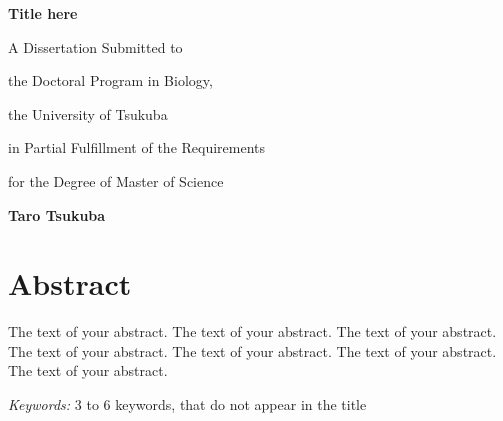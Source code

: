 \documentclass[12pt, a4paper]{report} %
\begin{document}
\def\spacingset#1{\renewcommand{\baselinestretch}%
{#1}\small\normalsize} \spacingset{1}


%


    \thispagestyle{empty}
    \vspace*{30mm}
    \begin{center}
    \LARGE{\bf Title here}
    \end{center}

    \vspace{6cm}
    \centerline{A Dissertation Submitted to}\par
    \centerline{the Doctoral Program in Biology,}\par
    \centerline{the University of Tsukuba}\par
    \centerline{in Partial Fulfillment of the Requirements}\par
    \centerline{for the Degree of Master of Science}\par

    \vspace{2cm}
    \centerline{\Large{\bf Taro Tsukuba}}
    \clearpage



\newpage

\chapter*{Abstract}
The text of your abstract. The text of your abstract. The text of your
abstract. The text of your abstract. The text of your abstract. The text
of your abstract. The text of your abstract.

\noindent%
{\it Keywords:} 3 to 6 keywords, that do not appear in the title
\vfill
\end{document}
